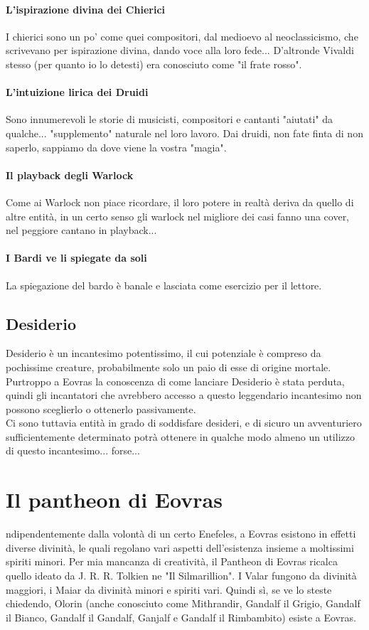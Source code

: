 \paragraph{L'ispirazione divina dei Chierici}I chierici sono un po' come quei compositori, dal medioevo al neoclassicismo, che scrivevano per ispirazione divina, dando voce alla loro fede... D'altronde Vivaldi stesso (per quanto io lo detesti) era conosciuto come "il frate rosso".
\paragraph{L'intuizione lirica dei Druidi}Sono innumerevoli le storie di musicisti, compositori e cantanti "aiutati" da qualche... "supplemento" naturale nel loro lavoro. Dai druidi, non fate finta di non saperlo, sappiamo da dove viene la vostra "magia".
\paragraph{Il playback degli Warlock}Come ai Warlock non piace ricordare, il loro potere in realtà deriva da quello di altre entità, in un certo senso gli warlock nel migliore dei casi fanno una cover, nel peggiore cantano in playback...
\paragraph{I Bardi ve li spiegate da soli}La spiegazione del bardo è banale e lasciata come esercizio per il lettore.

\subsection{Desiderio}

Desiderio è un incantesimo potentissimo, il cui potenziale è compreso da pochissime creature, probabilmente solo un paio di esse di origine mortale. \\ Purtroppo a Eovras la conoscenza di come lanciare Desiderio è stata perduta, quindi gli incantatori che avrebbero accesso a questo leggendario incantesimo non possono sceglierlo o ottenerlo passivamente. \\ Ci sono tuttavia entità in grado di soddisfare desideri, e di sicuro un avventuriero sufficientemente determinato potrà ottenere in qualche modo almeno un utilizzo di questo incantesimo... forse...

\section{Il pantheon di Eovras}

ndipendentemente dalla volontà di un certo Enefeles, a Eovras esistono in effetti diverse divinità, le quali regolano vari aspetti dell'esistenza insieme a moltissimi spiriti minori. Per mia mancanza di creatività, il Pantheon di Eovras ricalca quello ideato da J. R. R. Tolkien ne "Il Silmarillion". I Valar fungono da divinità maggiori, i Maiar da divinità minori e spiriti vari. Quindi sì, se ve lo steste chiedendo, Olorin (anche conosciuto come Mithrandir, Gandalf il Grigio, Gandalf il Bianco, Gandalf il Gandalf, Ganjalf e Gandalf il Rimbambito) esiste a Eovras.